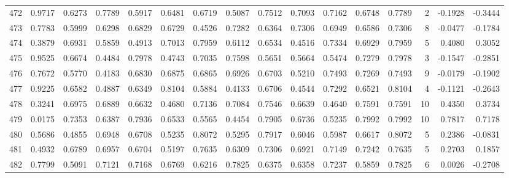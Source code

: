 \begin{tabular}{lrrrrrrrrrrrrrrr}
472 &      0.9717 &  0.6273 &  0.7789 &  0.5917 &  0.6481 &  0.6719 &  0.5087 &  0.7512 &  0.7093 &  0.7162 &   0.6748 &     0.7789 &      2 &                   -0.1928 &                    -0.3444 \\
473 &      0.7783 &  0.5999 &  0.6298 &  0.6829 &  0.6729 &  0.4526 &  0.7282 &  0.6364 &  0.7306 &  0.6949 &   0.6586 &     0.7306 &      8 &                   -0.0477 &                    -0.1784 \\
474 &      0.3879 &  0.6931 &  0.5859 &  0.4913 &  0.7013 &  0.7959 &  0.6112 &  0.6534 &  0.4516 &  0.7334 &   0.6929 &     0.7959 &      5 &                    0.4080 &                     0.3052 \\
475 &      0.9525 &  0.6674 &  0.4484 &  0.7978 &  0.4743 &  0.7035 &  0.7598 &  0.5651 &  0.5664 &  0.5474 &   0.7279 &     0.7978 &      3 &                   -0.1547 &                    -0.2851 \\
476 &      0.7672 &  0.5770 &  0.4183 &  0.6830 &  0.6875 &  0.6865 &  0.6926 &  0.6703 &  0.5210 &  0.7493 &   0.7269 &     0.7493 &      9 &                   -0.0179 &                    -0.1902 \\
477 &      0.9225 &  0.6582 &  0.4887 &  0.6349 &  0.8104 &  0.5884 &  0.4133 &  0.6706 &  0.4544 &  0.7292 &   0.6521 &     0.8104 &      4 &                   -0.1121 &                    -0.2643 \\
478 &      0.3241 &  0.6975 &  0.6889 &  0.6632 &  0.4680 &  0.7136 &  0.7084 &  0.7546 &  0.6639 &  0.4640 &   0.7591 &     0.7591 &     10 &                    0.4350 &                     0.3734 \\
479 &      0.0175 &  0.7353 &  0.6387 &  0.7936 &  0.6533 &  0.5565 &  0.4454 &  0.7905 &  0.6736 &  0.5235 &   0.7992 &     0.7992 &     10 &                    0.7817 &                     0.7178 \\
480 &      0.5686 &  0.4855 &  0.6948 &  0.6708 &  0.5235 &  0.8072 &  0.5295 &  0.7917 &  0.6046 &  0.5987 &   0.6617 &     0.8072 &      5 &                    0.2386 &                    -0.0831 \\
481 &      0.4932 &  0.6789 &  0.6957 &  0.6704 &  0.5197 &  0.7635 &  0.6309 &  0.7306 &  0.6921 &  0.7149 &   0.7242 &     0.7635 &      5 &                    0.2703 &                     0.1857 \\
482 &      0.7799 &  0.5091 &  0.7121 &  0.7168 &  0.6769 &  0.6216 &  0.7825 &  0.6375 &  0.6358 &  0.7237 &   0.5859 &     0.7825 &      6 &                    0.0026 &                    -0.2708 \\

\end{tabular}
